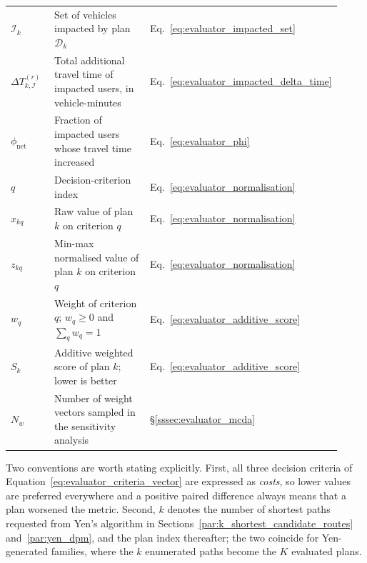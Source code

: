 \begin{longtable}{@{}p{0.16\linewidth}>{\raggedright\arraybackslash}p{0.60\linewidth}p{0.16\linewidth}@{}}
$\mathcal{I}_k$ & Set of vehicles impacted by plan $\mathcal{D}_k$ & Eq.~\eqref{eq:evaluator_impacted_set} \\
$\Delta T^{(r)}_{k,\mathcal{I}}$ & Total additional travel time of impacted users, in vehicle-minutes & Eq.~\eqref{eq:evaluator_impacted_delta_time} \\
$\phi_{\mathrm{net}}$ & Fraction of impacted users whose travel time increased & Eq.~\eqref{eq:evaluator_phi} \\
$q$ & Decision-criterion index & Eq.~\eqref{eq:evaluator_normalisation} \\
$x_{kq}$ & Raw value of plan $k$ on criterion $q$ & Eq.~\eqref{eq:evaluator_normalisation} \\
$z_{kq}$ & Min-max normalised value of plan $k$ on criterion $q$ & Eq.~\eqref{eq:evaluator_normalisation} \\
$w_q$ & Weight of criterion $q$; $w_q \geq 0$ and $\sum_q w_q = 1$ & Eq.~\eqref{eq:evaluator_additive_score} \\
$S_k$ & Additive weighted score of plan $k$; lower is better & Eq.~\eqref{eq:evaluator_additive_score} \\
$N_w$ & Number of weight vectors sampled in the sensitivity analysis & \S\ref{sssec:evaluator_mcda} \\

\end{longtable}

\noindent Two conventions are worth stating explicitly. First, all three
decision criteria of Equation~\eqref{eq:evaluator_criteria_vector} are
expressed as \emph{costs}, so lower values are preferred everywhere and a
positive paired difference always means that a plan worsened the metric.
Second, $k$ denotes the number of shortest paths requested from Yen's
algorithm in Sections~\ref{par:k_shortest_candidate_routes}
and~\ref{par:yen_dpm}, and the plan index thereafter; the two coincide for
Yen-generated families, where the $k$ enumerated paths become the $K$ evaluated
plans.
